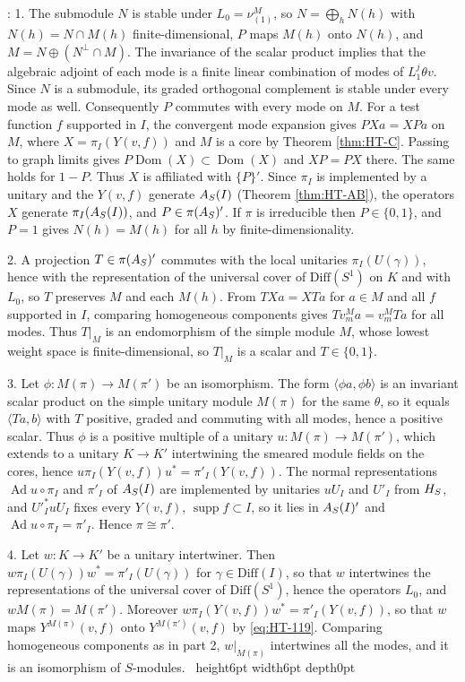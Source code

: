 \documentclass[leqno]{article}
\let\cal\relax
\newcommand{\cal}{\mathcal}
\newcommand{\la}{\langle}
\newcommand{\ra}{\rangle}
\newcommand{\qed}{\hfill \vrule height6pt  width6pt depth0pt}
\newcommand{\co}{\colon}
\newenvironment{proof}[1][]{\noindent {\it Proof #1} : }{\hbox{~}\qed
\smallskip
}
\numberwithin{equation}{section}
\begin{document}
\begin{proof}
1. The submodule $N$ is stable under $L_0 = \nu^M_{(1)}$, so $N = \bigoplus_h N(h)$ with $N(h) = N \cap M(h)$ finite-dimensional, $P$ maps $M(h)$ onto $N(h)$, and $M = N \oplus (N^\perp \cap M)$. The invariance of the scalar product implies that the algebraic adjoint of each mode is a finite linear combination of modes of $L_1^j\theta v$. Since $N$ is a submodule, its graded orthogonal complement is stable under every mode as well. Consequently $P$ commutes with every mode on $M$. For a test function $f$ supported in $I$, the convergent mode expansion gives $PXa = XPa$ on $M$, where $X = \pi_I(Y(v,f))$ and $M$ is a core by Theorem \ref{thm:HT-C}. Passing to graph limits gives $P\operatorname{Dom}(X)\subset\operatorname{Dom}(X)$ and $XP = PX$ there. The same holds for $1-P$. Thus $X$ is affiliated with $\{P\}'$. Since $\pi_I$ is implemented by a unitary \cite[p.~70]{HeT25} and the $Y(v,f)$ generate $\cal A_S(I)$ (Theorem \ref{thm:HT-AB}), the operators $X$ generate $\pi_I(\cal A_S(I))$, and $P \in \pi(\cal A_S)'$. If $\pi$ is irreducible then $P \in \{0,1\}$, and $P = 1$ gives $N(h) = M(h)$ for all $h$ by finite-dimensionality.

2. A projection $T \in \pi(\cal A_S)'$ commutes with the local unitaries $\pi_I(U(\gamma))$, hence with the representation of the universal cover of $\mathrm{Diff}(S^1)$ on $K$ and with $L_0$, so $T$ preserves $M$ and each $M(h)$. From $TXa = XTa$ for $a \in M$ and all $f$ supported in $I$, comparing homogeneous components gives $Tv^M_ma = v^M_mTa$ for all modes. Thus $T|_M$ is an endomorphism of the simple module $M$, whose lowest weight space is finite-dimensional, so $T|_M$ is a scalar and $T \in \{0,1\}$.

3. Let $\phi \co M(\pi) \to M(\pi')$ be an isomorphism. The form $\la\phi a,\phi b\ra$ is an invariant scalar product on the simple unitary module $M(\pi)$ for the same $\theta$, so it equals $\la Ta,b\ra$ with $T$ positive, graded and commuting with all modes, hence a positive scalar. Thus $\phi$ is a positive multiple of a unitary $u \co M(\pi) \to M(\pi')$, which extends to a unitary $K \to K'$ intertwining the smeared module fields on the cores, hence $u\pi_I(Y(v,f))u^* = \pi'_I(Y(v,f))$. The normal representations $\operatorname{Ad}u \circ \pi_I$ and $\pi'_I$ of $\cal A_S(I)$ are implemented by unitaries $uU_I$ and $U'_I$ from $\cal H_S$, and $U'^*_IuU_I$ fixes every $Y(v,f)$, $\operatorname{supp} f \subset I$, so it lies in $\cal A_S(I)'$ and $\operatorname{Ad}u \circ \pi_I = \pi'_I$. Hence $\pi \cong \pi'$.

4. Let $w \co K \to K'$ be a unitary intertwiner. Then $w\pi_I(U(\gamma))w^* = \pi'_I(U(\gamma))$ for $\gamma \in \mathrm{Diff}(I)$, so that $w$ intertwines the representations of the universal cover of $\mathrm{Diff}(S^1)$, hence the operators $L_0$, and $wM(\pi) = M(\pi')$. Moreover $w\pi_I(Y(v,f))w^* = \pi'_I(Y(v,f))$, so that $w$ maps $Y^{M(\pi)}(v,f)$ onto $Y^{M(\pi')}(v,f)$ by \eqref{eq:HT-119}. Comparing homogeneous components as in part 2, $w|_{M(\pi)}$ intertwines all the modes, and it is an isomorphism of $S$-modules.
\end{proof}
\end{document}

